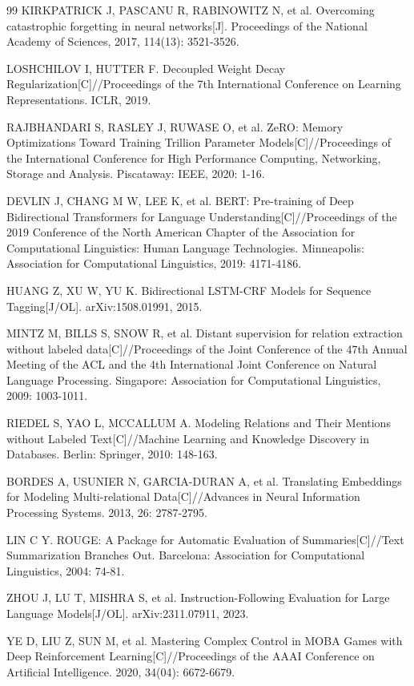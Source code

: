 \documentclass[fontset=fandol,type=master,campus=shenzhen,etitleauto=true]{hithesisbook}
\begin{document}
\begin{thebibliography}{99}
 KIRKPATRICK J, PASCANU R, RABINOWITZ N, et al. Overcoming catastrophic forgetting in neural networks[J]. Proceedings of the National Academy of Sciences, 2017, 114(13): 3521-3526.

 LOSHCHILOV I, HUTTER F. Decoupled Weight Decay Regularization[C]//Proceedings of the 7th International Conference on Learning Representations. ICLR, 2019.

 RAJBHANDARI S, RASLEY J, RUWASE O, et al. ZeRO: Memory Optimizations Toward Training Trillion Parameter Models[C]//Proceedings of the International Conference for High Performance Computing, Networking, Storage and Analysis. Piscataway: IEEE, 2020: 1-16.

 DEVLIN J, CHANG M W, LEE K, et al. BERT: Pre-training of Deep Bidirectional Transformers for Language Understanding[C]//Proceedings of the 2019 Conference of the North American Chapter of the Association for Computational Linguistics: Human Language Technologies. Minneapolis: Association for Computational Linguistics, 2019: 4171-4186.

 HUANG Z, XU W, YU K. Bidirectional LSTM-CRF Models for Sequence Tagging[J/OL]. arXiv:1508.01991, 2015.

 MINTZ M, BILLS S, SNOW R, et al. Distant supervision for relation extraction without labeled data[C]//Proceedings of the Joint Conference of the 47th Annual Meeting of the ACL and the 4th International Joint Conference on Natural Language Processing. Singapore: Association for Computational Linguistics, 2009: 1003-1011.

 RIEDEL S, YAO L, MCCALLUM A. Modeling Relations and Their Mentions without Labeled Text[C]//Machine Learning and Knowledge Discovery in Databases. Berlin: Springer, 2010: 148-163.

 BORDES A, USUNIER N, GARCIA-DURAN A, et al. Translating Embeddings for Modeling Multi-relational Data[C]//Advances in Neural Information Processing Systems. 2013, 26: 2787-2795.

 LIN C Y. ROUGE: A Package for Automatic Evaluation of Summaries[C]//Text Summarization Branches Out. Barcelona: Association for Computational Linguistics, 2004: 74-81.

 ZHOU J, LU T, MISHRA S, et al. Instruction-Following Evaluation for Large Language Models[J/OL]. arXiv:2311.07911, 2023.

 YE D, LIU Z, SUN M, et al. Mastering Complex Control in MOBA Games with Deep Reinforcement Learning[C]//Proceedings of the AAAI Conference on Artificial Intelligence. 2020, 34(04): 6672-6679.


\end{thebibliography}
\end{document}
